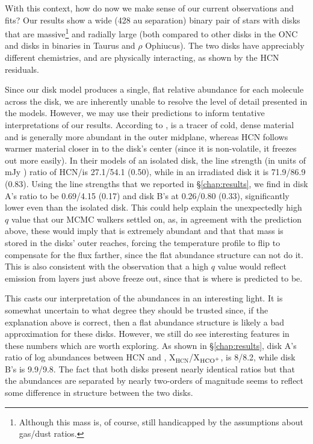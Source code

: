 With this context, how do now we make sense of our current observations and fits? Our results show a wide (428 au separation) binary pair of stars with disks that are massive\footnote{Although this mass is, of course, still handicapped by the assumptions about gas/dust ratios.} and radially large (both compared to other disks in the ONC and disks in binaries in Taurus and $\rho$ Ophiucus). The two disks have appreciably different chemistries, and are physically interacting, as shown by the HCN residuals.


Since our disk model produces a single, flat relative abundance for each molecule across the disk, we are inherently unable to resolve the level of detail presented in the models. However, we may use their predictions to inform tentative interpretations of our results. According to \citet{Walsh2013}, \hco is a tracer of cold, dense material and is generally more abundant in the outer midplane, whereas HCN follows warmer material closer in to the disk's center (since it is non-volatile, it freezes out more easily). In their models of an isolated disk, the line strength (in units of mJy \kms) ratio of HCN/\hco is 27.1/54.1 (0.50), while in an irradiated disk it is 71.9/86.9 (0.83). Using the line strengths that we reported in \S\ref{chap:results}, we find in disk A's ratio to be 0.69/4.15 (0.17) and disk B's at 0.26/0.80 (0.33), significantly lower even than the isolated disk. This could help explain the unexpectedly high $q$ value that our MCMC walkers settled on, as, in agreement with the \citet{Walsh2013} prediction above, these would imply that \hco is extremely abundant and that that mass is stored in the disks' outer reaches, forcing the temperature profile to flip to compensate for the flux farther, since the flat abundance structure can not do it. This is also consistent with the \citet{Schwarz2016} observation that a high $q$ value would reflect emission from layers just above freeze out, since that is where \hco is predicted to be.



This casts our interpretation of the abundances in an interesting light. It is somewhat uncertain to what degree they should be trusted since, if the explanation above is correct, then a flat abundance structure is likely a bad approximation for these disks. However, we still do see interesting features in these numbers which are worth exploring. As shown in \S\ref{chap:results}, disk A's ratio of log abundances between HCN and \hco, X$_\text{HCN}$/X$_\text{HCO$^+$}$, is 8/8.2, while disk B's is 9.9/9.8. The fact that both disks present nearly identical ratios but that the abundances are separated by nearly two-orders of magnitude seems to reflect some difference in structure between the two disks.

